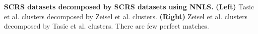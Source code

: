 \textbf{SCRS datasets decomposed by SCRS datasets using NNLS. }
\textbf{(Left)} Tasic et al. clusters decomposed by Zeisel et al. clusters. \textbf{(Right)} Zeisel et al. clusters decomposed by Tasic et al. clusters. There are few perfect matches.
